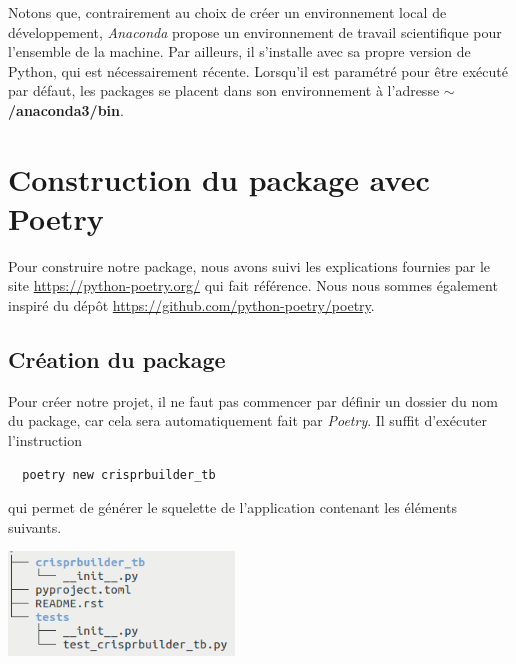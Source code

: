 \documentclass[twoside,a4paper,11pt,frenchb,openany]{report}
\begin{document}
Notons que, contrairement au choix de créer un environnement local de développement, \textit{Anaconda} propose un environnement de travail scientifique pour l'ensemble de la machine. Par ailleurs, il s'installe avec sa propre version de Python, qui est nécessairement récente. Lorsqu'il est paramétré pour être exécuté par défaut, les packages se placent dans son environnement à l'adresse \textbf{$\sim$/anaconda3/bin}.


	


\chapter{Construction du package avec Poetry}


Pour construire notre package, nous avons suivi les explications fournies par le site \url{https://python-poetry.org/} qui fait référence. Nous nous sommes également inspiré du dépôt \url{https://github.com/python-poetry/poetry}.


\section{Création du package}

Pour créer notre projet, il ne faut pas commencer par définir un dossier du nom du package, car cela sera automatiquement fait par \textit{Poetry}. Il suffit d'exécuter l'instruction

\begin{verbatim}
  poetry new crisprbuilder_tb
\end{verbatim}

qui permet de générer le squelette de l'application contenant les éléments suivants.

\includegraphics[width=6cm]{nom_package_tree.png}
\end{document}
